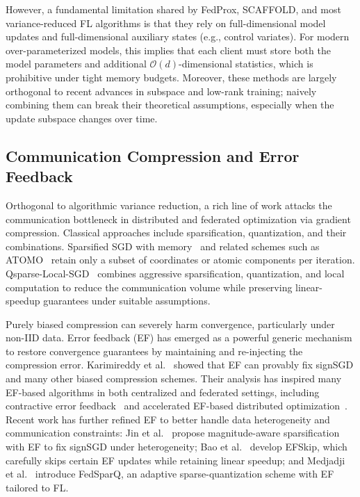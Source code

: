 However, a fundamental limitation shared by FedProx, SCAFFOLD, and most variance-reduced FL algorithms is that they rely on full-dimensional model updates and full-dimensional auxiliary states (e.g., control variates). For modern over-parameterized models, this implies that each client must store both the model parameters and additional $\mathcal{O}(d)$-dimensional statistics, which is prohibitive under tight memory budgets. Moreover, these methods are largely orthogonal to recent advances in subspace and low-rank training; naively combining them can break their theoretical assumptions, especially when the update subspace changes over time.

\subsection{Communication Compression and Error Feedback}

Orthogonal to algorithmic variance reduction, a rich line of work attacks the communication bottleneck in distributed and federated optimization via gradient compression. Classical approaches include sparsification, quantization, and their combinations. Sparsified SGD with memory~\cite{stich2018sparsesgd} and related schemes such as ATOMO~\cite{wang2018atomo} retain only a subset of coordinates or atomic components per iteration. Qsparse-Local-SGD~\cite{basu2020qsparse} combines aggressive sparsification, quantization, and local computation to reduce the communication volume while preserving linear-speedup guarantees under suitable assumptions.

Purely biased compression can severely harm convergence, particularly under non-IID data. Error feedback (EF) has emerged as a powerful generic mechanism to restore convergence guarantees by maintaining and re-injecting the compression error. Karimireddy et al.~\cite{karimireddy2019error} showed that EF can provably fix signSGD and many other biased compression schemes. Their analysis has inspired many EF-based algorithms in both centralized and federated settings, including contractive error feedback~\cite{li2024contractiveef} and accelerated EF-based distributed optimization~\cite{gao2025accelerated}. Recent work has further refined EF to better handle data heterogeneity and communication constraints: Jin et al.~\cite{jin2024magnitude} propose magnitude-aware sparsification with EF to fix signSGD under heterogeneity; Bao et al.~\cite{bao2025efskip} develop EFSkip, which carefully skips certain EF updates while retaining linear speedup; and Medjadji et al.~\cite{medjadji2025fedsparq} introduce FedSparQ, an adaptive sparse-quantization scheme with EF tailored to FL.

